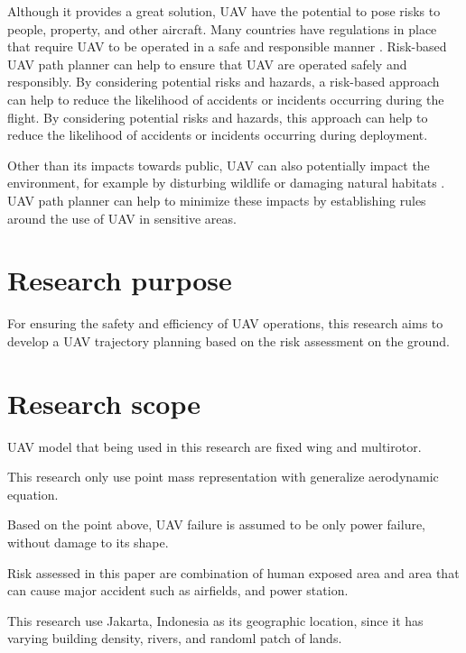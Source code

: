\documentclass[12pt]{report}
\begin{document}
            Although it provides a great solution, UAV have the potential to pose risks to people, property, and other
        aircraft. Many countries have regulations in place that require UAV to be operated in a safe and responsible
        manner \cite{faa_ecfr_2016}. Risk-based UAV path planner can help to ensure that UAV are operated safely and
        responsibly. By considering potential risks and hazards, a risk-based approach can help to reduce the likelihood
        of accidents or incidents occurring during the flight. By considering potential risks and hazards, this approach
        can help to reduce the likelihood of accidents or incidents occurring during deployment.

            Other than its impacts towards public, UAV can also potentially impact the environment, for example by
        disturbing wildlife or damaging natural habitats \cite{holland_how_2015}. UAV path planner can help to minimize
        these impacts by establishing rules around the use of UAV in sensitive areas.
    \section{Research purpose}
        For ensuring the safety and efficiency of UAV operations, this research aims to develop a
        UAV trajectory planning based on the risk assessment on the ground.
    \section{Research scope}
        \begin{myitemize}   
            \item UAV model that being used in this research are fixed wing and multirotor.
            \item This research only use point mass representation with generalize aerodynamic equation.
            \item Based on the point above, UAV failure is assumed to be only power failure, without damage to its shape.
            \item Risk assessed in this paper are combination of human exposed area and area that can cause major accident such as airfields, and power station.
            \item This research use Jakarta, Indonesia as its geographic location, since it has varying building density, rivers, and randoml patch of lands.
        \end{myitemize}
        
\end{document}
